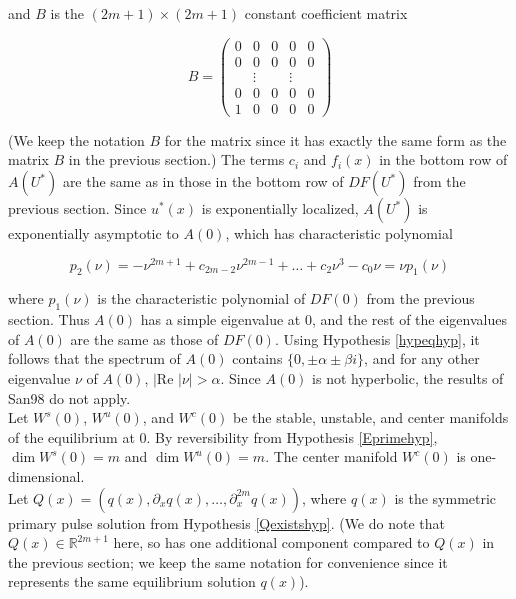 \documentclass[12pt]{article}
\def\R{{\mathbb R}}
\begin{document}
and $B$ is the $(2m +1) \times (2m+1)$ constant coefficient matrix

\begin{equation}\label{DefB}
B = \begin{pmatrix}0 & 0 & 0 & 0 & 0 \\0 & 0 & 0 & 0 & 0 \\  & 
\vdots & & \vdots & \\0 & 0 & 0 & 0 & 0 \\1 & 0 & 0 & 0 & 0 \end{pmatrix} 
\end{equation}

(We keep the notation $B$ for the matrix since it has exactly the same form as the matrix $B$ in the previous section.) The terms $c_i$ and $f_i(x)$ in the bottom row of $A(U^*)$ are the same as in those in the bottom row of $DF(U^*)$ from the previous section. Since $u^*(x)$ is exponentially localized, $A(U^*)$ is exponentially asymptotic to $A(0)$, which has characteristic polynomial

\begin{equation}\label{charpolyA0}
p_2(\nu) = -\nu^{2m+1} + c_{2m-2} \nu^{2m-1} + \dots + c_2 \nu^3 - c_0 \nu = \nu p_1(\nu)
\end{equation}

where $p_1(\nu)$ is the characteristic polynomial of $DF(0)$ from the previous section. Thus $A(0)$ has a simple eigenvalue at 0, and the rest of the eigenvalues of $A(0)$ are the same as those of $DF(0)$. Using Hypothesis \ref{hypeqhyp}, it follows that the spectrum of $A(0)$ contains $\{ 0, \pm \alpha \pm \beta i\}$, and for any other eigenvalue $\nu$ of $A(0)$, $|\text{Re }|\nu| > \alpha$. Since $A(0)$ is not hyperbolic, the results of San98 do not apply.\\

Let $W^s(0)$, $W^u(0)$, and $W^c(0)$ be the stable, unstable, and center manifolds of the equilibrium at 0. By reversibility from Hypothesis \ref{Eprimehyp}, $\dim W^s(0) = m$ and $\dim W^u(0) = m$. The center manifold $W^c(0)$ is one-dimensional.\\

Let $Q(x) = (q(x), \partial_x q(x), \dots, \partial_x^{2m} q(x))$, where $q(x)$ is the symmetric primary pulse solution from Hypothesis \ref{Qexistshyp}. (We do note that $Q(x) \in \R^{2m+1}$ here, so has one additional component compared to $Q(x)$ in the previous section; we keep the same notation for convenience since it represents the same equilibrium solution $q(x)$). \\
\end{document}
